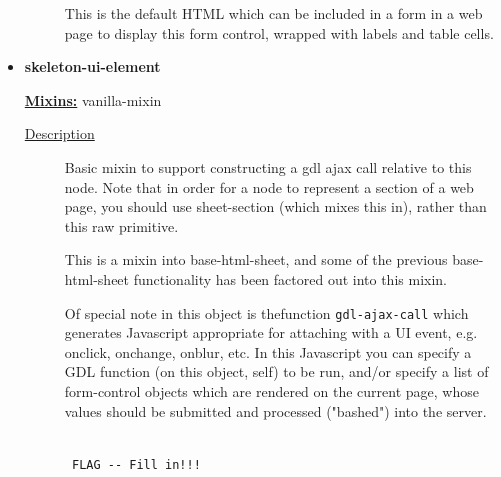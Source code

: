 \documentclass [11pt]{book}
\begin{document}
\begin{itemize}
\begin{description}
 This is the default HTML which can be included in a form in a web page to display this form control, wrapped with labels and table cells.




\end{description}







\item {}
\label{prim:skeleton-ui-element}
\textbf{skeleton-ui-element}


\textbf{
\underline{Mixins:}} vanilla-mixin





\begin{description}

\item [
\underline{Description}]


Basic mixin to support constructing a gdl ajax call 
relative to this node. Note that in order for a node to represent a section of a 
web page, you should use sheet-section (which mixes this in), rather than this raw 
primitive. 

This is a mixin into base-html-sheet, and some of the previous base-html-sheet 
functionality has been factored out into this mixin. 

Of special note in this object is thefunction \texttt{gdl-ajax-call} which generates 
Javascript appropriate for attaching with a UI event, e.g. onclick, onchange, 
onblur, etc. In this Javascript you can specify a GDL function (on this object, self) 
to be run, and/or specify a list of form-control objects which are rendered on 
the current page, whose values should be submitted and processed ("bashed") into the 
server.



\end{description}




\begin{figure}
\begin{lrbox}{\boxedverb}
\begin{minipage}{\linewidth}
{\small

\begin{verbatim}

 FLAG -- Fill in!!!


\end{verbatim}}
\end{minipage}
\end{lrbox}
\fbox{\usebox{\boxedverb}}


\end{figure}
\end{itemize}
\end{document}
